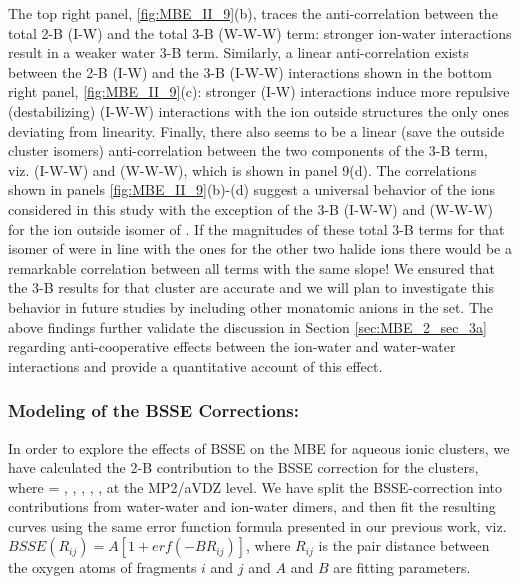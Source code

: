 \documentclass[11pt, proquest]{uwthesis}[2020/02/24]
\let\ce\ch
\begin{document}
\par The top right panel, \ref{fig:MBE_II_9}(b), traces the anti-correlation between the total 2-B (I-W) and the total 3-B (W-W-W) term: stronger ion-water interactions result in a weaker water 3-B term. Similarly, a linear anti-correlation exists between the 2-B (I-W) and the 3-B (I-W-W) interactions shown in the bottom right panel, \ref{fig:MBE_II_9}(c): stronger (I-W) interactions induce more repulsive (destabilizing) (I-W-W) interactions with the \ce{X^-} ion outside structures the only ones deviating from linearity. Finally, there also seems to be a linear (save the \ce{X^-} outside cluster isomers) anti-correlation between the two components of the 3-B term, viz. (I-W-W) and (W-W-W), which is shown in panel 9(d). The correlations shown in panels \ref{fig:MBE_II_9}(b)-(d) suggest a universal behavior of the ions considered in this study with the exception of the 3-B (I-W-W) and (W-W-W) for the ion outside isomer of \ce{Cl^-}. If the magnitudes of these total 3-B terms for that isomer of \ce{Cl^-} were in line with the ones for the other two halide ions there would be a remarkable correlation between all terms with the same slope! We ensured that the 3-B results for that cluster are accurate and we will plan to investigate this behavior in future studies by including other monatomic anions in the set. The above findings further validate the discussion in Section \ref{sec:MBE_2_sec_3a} regarding anti-cooperative effects between the ion-water and water-water interactions and provide a quantitative account of this effect.

\subsubsection{\textbf{Modeling of the BSSE Corrections:}}
\par In order to explore the effects of BSSE on the MBE for aqueous ionic clusters, we have calculated the 2-B contribution to the BSSE correction for the \ce{Z^{+/-}(H2O)9} clusters, where \ce{Z} = \ce{Li^+}, \ce{K^+}, \ce{Cs^+}, \ce{Cl^-}, \ce{Br^-}, \ce{I^-} at the MP2/aVDZ level. We have split the BSSE-correction into contributions from water-water and ion-water dimers, and then fit the resulting curves using the same error function formula presented in our previous work, viz. $BSSE(R_{ij})=A[1+erf(-BR_{ij})]$, where $R_{ij}$ is the pair distance between the oxygen atoms of fragments $i$ and $j$ and $A$ and $B$ are fitting parameters.
\end{document}
